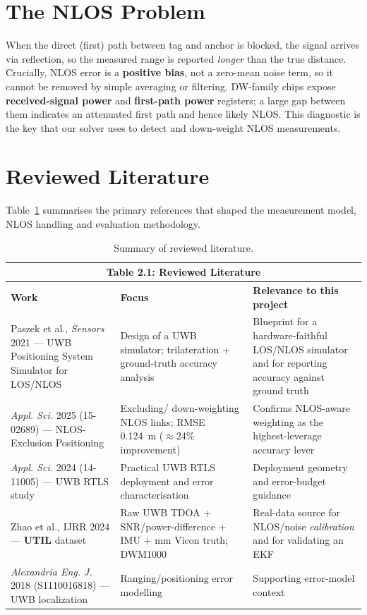 \documentclass[a4paper,12pt,onecolumn]{report}
\begin{document}
\section{The NLOS Problem}
When the direct (first) path between tag and anchor is blocked, the signal
arrives via reflection, so the measured range is reported \emph{longer} than the
true distance. Crucially, NLOS error is a \textbf{positive bias}, not a
zero-mean noise term, so it cannot be removed by simple averaging or filtering.
DW-family chips expose \textbf{received-signal power} and \textbf{first-path
power} registers; a large gap between them indicates an attenuated first path
and hence likely NLOS. This diagnostic is the key that our solver uses to detect
and down-weight NLOS measurements.

\section{Reviewed Literature}
Table~\ref{tab:litsurvey} summarises the primary references that shaped the
measurement model, NLOS handling and evaluation methodology.

\begin{table}[H]
\begin{center}
\begin{tabular}{ | p{4.3cm} | p{4.0cm} | p{4.7cm} | }
\hline
\multicolumn{3}{|c|}{\textbf{Table 2.1: Reviewed Literature}}\\
\hline
\textbf{Work} & \textbf{Focus} & \textbf{Relevance to this project}\\ \hline
Paszek et al., \emph{Sensors} 2021 --- UWB Positioning System Simulator for
LOS/NLOS &
Design of a UWB simulator; trilateration + ground-truth accuracy analysis &
Blueprint for a hardware-faithful LOS/NLOS simulator and for reporting accuracy
against ground truth \\ \hline
\emph{Appl. Sci.} 2025 (15-02689) --- NLOS-Exclusion Positioning &
Excluding/ down-weighting NLOS links; RMSE 0.124~m ($\approx$24\% improvement) &
Confirms NLOS-aware weighting as the highest-leverage accuracy lever \\ \hline
\emph{Appl. Sci.} 2024 (14-11005) --- UWB RTLS study &
Practical UWB RTLS deployment and error characterisation &
Deployment geometry and error-budget guidance \\ \hline
Zhao et al., IJRR 2024 --- \textbf{UTIL} dataset &
Raw UWB TDOA + SNR/power-difference + IMU + mm Vicon truth; DWM1000 &
Real-data source for NLOS/noise \emph{calibration} and for validating an EKF \\ \hline
\emph{Alexandria Eng. J.} 2018 (S1110016818) --- UWB localization &
Ranging/positioning error modelling &
Supporting error-model context \\
\hline
\end{tabular}
\caption{Summary of reviewed literature.}
\label{tab:litsurvey}
\end{center}
\end{table}
\end{document}
